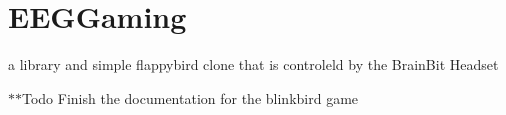 \chapter{EEGGaming}
\hypertarget{md__r_e_a_d_m_e}{}\label{md__r_e_a_d_m_e}
\label{md__r_e_a_d_m_e_autotoc_md0}%
%


a library and simple flappybird clone that is controleld by the Brain\+Bit Headset

\texorpdfstring{$\ast$}{*}\texorpdfstring{$\ast$}{*}\+Todo Finish the documentation for the blinkbird game 